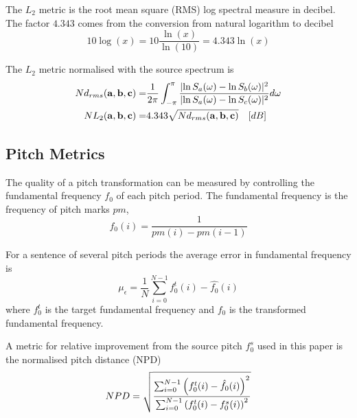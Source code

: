 \begin{remark}
	The $L_2$ metric is the root mean square (RMS) log spectral measure in decibel. The factor $4.343$ comes from the conversion from natural logarithm to decibel
	\begin{equation}
		10\log(x) = 10 \frac{\ln(x)}{\ln(10)} = 4.343\ln(x) 
	\end{equation}	
\end{remark}

The $L_2$ metric normalised with the source spectrum is
\begin{equation}
	\begin{split}
	Nd_{rms}(\mathbf{a},\mathbf{b},\mathbf{c}) = & \frac{1}{2\pi}\int_{-\pi}^{\pi} \frac{\lvert\ln S_a(\omega)-\ln S_b(\omega)\rvert^2}{\lvert\ln S_a(\omega)-\ln S_c(\omega)\rvert^2} d\omega \\
	NL_2(\mathbf{a},\mathbf{b},\mathbf{c}) = & 4.343 \sqrt{Nd_{rms}(\mathbf{a},\mathbf{b},\mathbf{c})} \quad [dB]
	\end{split}
\end{equation}

\subsection{Pitch Metrics} %
\label{sub:pitch_metrics}
The quality of a pitch transformation can be measured by controlling the fundamental frequency $f_0$ of each pitch period. The fundamental frequency is the frequency of pitch marks $pm$, \ie 
\begin{equation}
	f_0(i) = \frac{1}{pm(i)-pm(i-1)}
\end{equation}

For a sentence of several pitch periods the average error in fundamental frequency is
\begin{equation}
	\mu_{\epsilon} = \frac{1}{N}\sum_{i=0}^{N-1} f_0^t(i) - \hat{f_0}(i)
\end{equation}
where $f_0^t$ is the target fundamental frequency and $\hat{f_0}$ is the transformed fundamental frequency.

A metric for relative improvement from the source pitch $f_0^s$ used in this paper is the normalised pitch distance (NPD)
\begin{equation}
	NPD = \sqrt{\frac{\sum_{i=0}^{N-1} \left(f_0^t(i)-\hat{f_0}(i)\right)^2}{\sum_{i=0}^{N-1} \left(f_0^t(i)-f_0^s(i)\right)^2}}
\end{equation}



